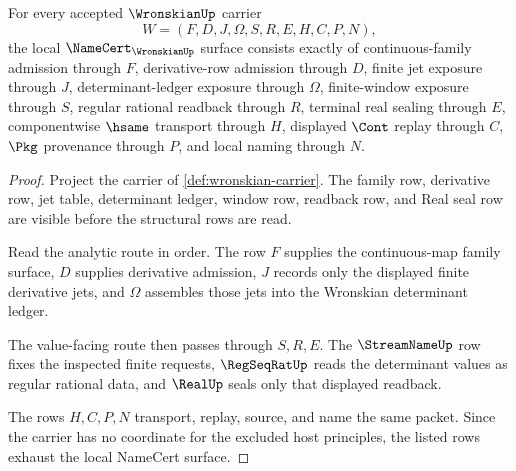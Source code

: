 \begin{theorem}
\label{thm:wronskian-namecert-obligations}
For every accepted $\WronskianUp$ carrier
$$
W=(F,D,J,\Omega,S,R,E,H,C,P,N),
$$
the local $\NameCert_{\WronskianUp}$ surface consists exactly of continuous-family admission through $F$, derivative-row admission through $D$, finite jet exposure through $J$, determinant-ledger exposure through $\Omega$, finite-window exposure through $S$, regular rational readback through $R$, terminal real sealing through $E$, componentwise $\hsame$ transport through $H$, displayed $\Cont$ replay through $C$, $\Pkg$ provenance through $P$, and local naming through $N$.
\end{theorem}
\begin{proof}
Project the carrier of \autoref{def:wronskian-carrier}. The family row, derivative row, jet table, determinant ledger, window row, readback row, and Real seal row are visible before the structural rows are read.

Read the analytic route in order. The row $F$ supplies the continuous-map family surface, $D$ supplies derivative admission, $J$ records only the displayed finite derivative jets, and $\Omega$ assembles those jets into the Wronskian determinant ledger.

The value-facing route then passes through $S,R,E$. The $\StreamNameUp$ row fixes the inspected finite requests, $\RegSeqRatUp$ reads the determinant values as regular rational data, and $\RealUp$ seals only that displayed readback.

The rows $H,C,P,N$ transport, replay, source, and name the same packet. Since the carrier has no coordinate for the excluded host principles, the listed rows exhaust the local NameCert surface.
\end{proof}

